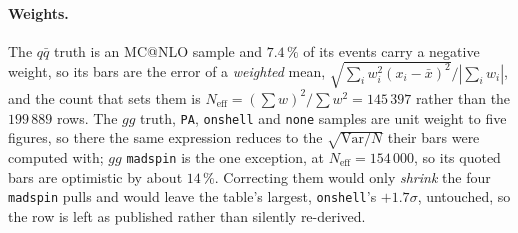 \documentclass[a4paper,11pt]{article}
\providecommand{\code}[1]{\texttt{#1}}
\begin{document}
\paragraph{Weights.} The $q\bar q$ truth is an MC@NLO sample and $7.4\,\%$ of
its events carry a negative weight, so its bars are the error of a
\emph{weighted} mean, $\sqrt{\sum_iw_i^2(x_i-\bar x)^2}\big/|\sum_iw_i|$, and
the count that sets them is $N_\mathrm{eff}=(\sum w)^2/\sum w^2=145\,397$ rather
than the $199\,889$ rows. The $gg$ truth, \code{PA}, \code{onshell} and
\code{none} samples are unit weight to five figures, so there the same
expression reduces to the $\sqrt{\mathrm{Var}/N}$ their bars were computed with;
$gg$ \code{madspin} is the one exception, at $N_\mathrm{eff}=154\,000$, so its
quoted bars are optimistic by about $14\,\%$. Correcting them would only
\emph{shrink} the four \code{madspin} pulls and would leave the table's largest,
\code{onshell}'s $+1.7\sigma$, untouched, so the row is left as published rather
than silently re-derived.
\end{document}
